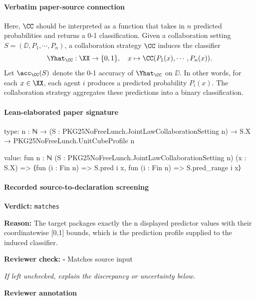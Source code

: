 \documentclass[10pt]{article}
\newcommand{\reviewerbox}{%
  \par\noindent\fbox{\parbox{0.96\linewidth}{\rule{0pt}{0.38in}}}\par
}
\newcommand{\reviewmatch}[1]{%
  \par\noindent\textbf{Reviewer check:} $\square$\; #1\par
  \noindent\emph{If left unchecked, explain the discrepancy or uncertainty below.}\par
}
\begin{document}
\paragraph{Verbatim paper-source connection}
\begin{ReviewVerbatim}
Here, $\CC$ should be interpreted as a function that takes in $n$ predicted probabilities and returns a 0-1 classification. Given a collaboration setting $S=(\DD, P_1, \cdots, P_n)$, a collaboration strategy $\CC$ induces the classifier
\begin{equation}
    \Yhat_\CC: \XX \rightarrow \{0,1\},\quad x \mapsto \CC(P_1(x),\cdots,P_n(x)).
\end{equation}
Let $\acc_\CC(S)$ denote the 0-1 accuracy of $\Yhat_\CC$ on $\DD$. In other words, for each $x\in \XX$, each agent $i$ produces a predicted probability $P_i(x).$ The collaboration strategy aggregates these predictions into a binary classification.
\end{ReviewVerbatim}



\paragraph{Lean-elaborated paper signature}
\begin{ReviewVerbatim}
type:
{n : ℕ} → (S : PKG25NoFreeLunch.JointLawCollaborationSetting n) → S.X → PKG25NoFreeLunch.UnitCubeProfile n

value:
fun {n : ℕ} (S : PKG25NoFreeLunch.JointLawCollaborationSetting n) (x : S.X) =>
  ⟨fun (i : Fin n) => S.pred i x, fun (i : Fin n) => S.pred_range i x⟩
\end{ReviewVerbatim}


\paragraph{Recorded source-to-declaration screening}
\textbf{Verdict:} \texttt{matches}
\\
{\raggedright
\textbf{Reason:} The target packages exactly the n displayed predictor values with their coordinatewise [0,1] bounds, which is the prediction profile supplied to the induced classifier.\allowbreak{}
\par}
\reviewmatch{Matches source input}
\noindent\textbf{Reviewer annotation}\par
\reviewerbox
\clearpage
\hypertarget{paper-prerequisite-9bb2bbf635f9cd10}{}
\end{document}
